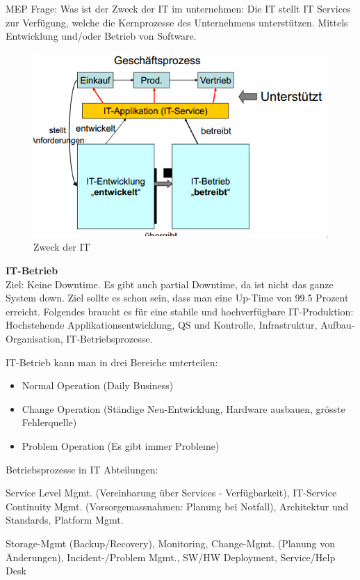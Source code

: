 MEP Frage: Was ist der Zweck der IT im unternehmen:
\label{zweck-der-it-im-unternehmen}
Die IT stellt IT Services zur Verfügung, welche die Kernprozesse des Unternehmens unterstützen. Mittels Entwicklung und/oder Betrieb von Software.

\begin{figure}[h!]
	\centering
	\includegraphics{fig/zweck-der-it}
	\caption{Zweck der IT}
\end{figure}

\textbf{IT-Betrieb}\\
Ziel: Keine Downtime. Es gibt auch partial Downtime, da ist nicht das ganze System down. Ziel sollte es schon sein, dass man eine Up-Time von 99.5 Prozent erreicht. Folgendes braucht es für eine stabile und hochverfügbare IT-Produktion: Hochstehende Applikationsentwicklung, QS und Kontrolle, Infrastruktur, Aufbau-Organisation, IT-Betriebsprozesse.

IT-Betrieb kann man in drei Bereiche unterteilen: 

\begin{itemize}
	\item Normal Operation (Daily Business)
	\item Change Operation (Ständige Neu-Entwicklung, Hardware ausbauen, grösste Fehlerquelle)
	\item Problem Operation (Es gibt immer Probleme)
\end{itemize}

Betriebsprozesse in IT Abteilungen:

Service Level Mgmt. (Vereinbarung über Services - Verfügbarkeit), IT-Service Continuity Mgmt. (Vorsorgemassnahmen: Planung bei Notfall), Architektur und Standards, Platform Mgmt.

Storage-Mgmt (Backup/Recovery), Monitoring, Change-Mgmt. (Planung von Änderungen),  Incident-/Problem Mgmt., SW/HW Deployment, Service/Help Desk

